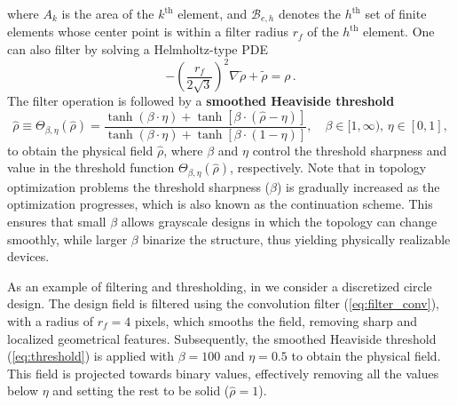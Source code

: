     where $A_k$ is the area of the $k^\text{th}$ element, and $\mathcal{B}_{e, h}$ denotes
    the
   $h^\text{th}$ set of finite elements whose center point is within a filter
    radius $r_f$ of the
   $h^\text{th}$ element. One can also filter by solving a Helmholtz-type
    PDE~\cite{PDE_filter}
       \begin{equation}
    -\left(\frac{r_f}{2 \sqrt{3}}\right)^2 \nabla
    \tilde{\rho}+\tilde{\rho}=\rho\,.
       \end{equation}
    The filter operation is followed by a \textbf{smoothed Heaviside
    threshold}~\cite{projection}
       \begin{equation}\label{eq:threshold}
    \hat{\rho} \equiv \Theta_{\beta,\eta}(\hat{\rho}) =\frac{\tanh (\beta \cdot \eta)+\tanh \left[ \beta
               \cdot(\hat{\rho}-\eta) \right]}{\tanh (\beta \cdot \eta)+\tanh \left[ \beta \cdot(1-\eta) \right]},
    \quad \beta \in[1, \infty),\, \eta \in[0,1],
       \end{equation}
    to obtain the physical field $\hat{\rho}$, where $\beta$ and $\eta$ control the threshold sharpness and value in the 
    threshold function $\Theta_{\beta,\eta}(\hat{\rho})$,
    respectively. Note that in topology optimization problems the threshold sharpness ($\beta$) is gradually increased as the optimization progresses, which is also known as 
    the continuation scheme. This ensures that
    small $\beta$ allows grayscale designs in which the topology can change smoothly, while larger
       $\beta$ binarize the structure, thus yielding physically realizable devices.
       
    As an example of filtering and thresholding, in 
        we consider a discretized circle design.
    The design field is filtered using the convolution filter (\eqref{eq:filter_conv}), with a radius of $r_f=4$ pixels, which smooths the field, removing sharp and localized
    geometrical features. Subsequently, the smoothed Heaviside threshold (\eqref{eq:threshold}) is applied with $\beta=100$ and $\eta=0.5$ to obtain the physical field. This field is projected towards binary 
    values, effectively removing all the values below $\eta$ and setting the rest to be solid ($\hat{\rho}=1$).
   

